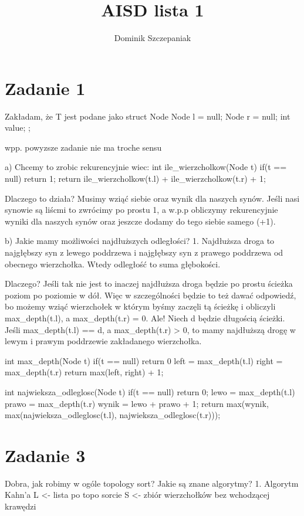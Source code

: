 \documentclass[12pt]{article}
\title{AISD lista 1}
\author{Dominik Szczepaniak}
\begin{document}
\maketitle

\bgroup\obeylines

\section{Zadanie 1}
Zakładam, że T jest podane jako 
struct Node{
    Node l = null;
    Node r = null;
    int value;
};

wpp. powyzsze zadanie nie ma troche sensu

a)
Chcemy to zrobic rekurencyjnie wiec:
int ile_wierzcholkow(Node t){
    if(t == null){
        return 1;
    }
    return ile_wierzcholkow(t.l) + ile_wierzcholkow(t.r) + 1;
}

Dlaczego to działa? Musimy wziąć siebie oraz wynik dla naszych synów. Jeśli nasi synowie są liścmi to zwrócimy po prostu 1, a w.p.p obliczymy rekurencyjnie wyniki dla naszych synów oraz jeszcze dodamy do tego siebie samego (+1).

b)
Jakie mamy możliwości najdłuższych odległości?
1. Najdłuższa droga to najgłębszy syn z lewego poddrzewa i najgłębszy syn z prawego poddrzewa od obecnego wierzchołka. Wtedy odległość to suma głębokości. 

Dlaczego? Jeśli tak nie jest to inaczej najdłuższa droga będzie po prostu ścieżka poziom po poziomie w dół. Więc w szczególności będzie to też dawać odpowiedź, bo możemy wziąć wierzchołek w którym byśmy zaczęli tą ścieżkę i obliczyli max_depth(t.l), a max_depth(t.r) = 0. Ale! Niech d będzie długością ścieżki. Jeśli max_depth(t.l) == d, a max_depth(t.r) > 0, to mamy najdłuższą drogę w lewym i prawym poddrzewie zakładanego wierzchołka.

int max_depth(Node t){
    if(t == null){
        return 0
    }
    left = max_depth(t.l)
    right = max_depth(t.r)
    return max(left, right) + 1;
}

int najwieksza_odleglosc(Node t){
    if(t == null){
        return 0;
    }
    lewo = max_depth(t.l)
    prawo = max_depth(t.r)
    wynik = lewo + prawo + 1;
    return max(wynik, max(najwieksza_odleglosc(t.l), najwieksza_odleglosc(t.r)));
}

\section{Zadanie 3}
Dobra, jak robimy w ogóle topology sort? Jakie są znane algorytmy? 
1. Algorytm Kahn'a 
L <- lista po topo sorcie 
S <- zbiór wierzchołków bez wchodzącej krawędzi
\end{document}
